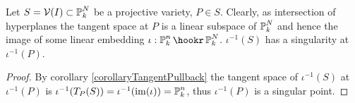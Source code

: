 \begin{corollary} \label{corollaryIntersectionWithTangent}
Let $S = \operatorname{\mathcal V}(I) \subset \operatorname{\mathbb P}^N_k$ be a projective variety, $P\in S$.
Clearly, as intersection of hyperplanes the tangent space at $P$ is a linear subspace of $\operatorname{\mathbb P}^N_k$ and hence the image of some linear embedding $\iota : \proj^n_k \hookr \proj^N_k$.
$\iota^{-1}(S)$ has a singularity at $\iota^{-1}(P)$.
\end{corollary}
\begin{proof}
By corollary \ref{corollaryTangentPullback} the tangent space of $\iota^{-1}(S)$ at $\iota^{-1}(P)$ is $\iota^{-1}(T_P(S)) = \iota^{-1}({\operatorname{im}}(\iota)) = \operatorname{\mathbb P}^n_k$, thus $\iota^{-1}(P)$ is a singular point.
\end{proof}

